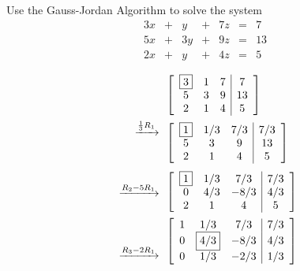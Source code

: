 \documentclass{ximera}
\begin{document}
 
\begin{example}\label{ex:gaussjordanalg}
Use the Gauss-Jordan Algorithm to solve the system
$$\begin{array}{ccccccccc}
      3x &+ &y&+&7z&= &7 \\
     5x& +&3y&+&9z&=&13\\
      2x&+ &y&+&4z&=&5
    \end{array}$$
\begin{explanation}
\begin{align*}&\left[\begin{array}{ccc|c} 
 \fbox{$3$}&1&7&7\\5&3&9&13\\2&1&4&5
 \end{array}\right]\\
 \begin{array}{c}
  \xrightarrow{\frac{1}{3}R_1}\\
\\
\\
 \end{array}
 &\left[\begin{array}{ccc|c} 
 \fbox{$1$}&1/3&7/3&7/3\\5&3&9&13\\2&1&4&5
 \end{array}\right]\\
 \begin{array}{c}
 \\
 \xrightarrow{R_2-5R_1}\\
\\
\end{array}
&\left[\begin{array}{ccc|c} 
 \fbox{$1$}&1/3&7/3&7/3\\0&4/3&-8/3&4/3\\2&1&4&5
 \end{array}\right]\\
 \begin{array}{c}
  \\
\\
 \xrightarrow{R_3-2R_1}\\
\end{array}&\left[\begin{array}{ccc|c} 
 1&1/3&7/3&7/3\\0&\fbox{$4/3$}&-8/3&4/3\\0&1/3&-2/3&1/3
 \end{array}\right]\\
 \begin{array}{c}
\\

\end{array}
\end{align*}
\end{explanation}
\end{example}
\end{document}
